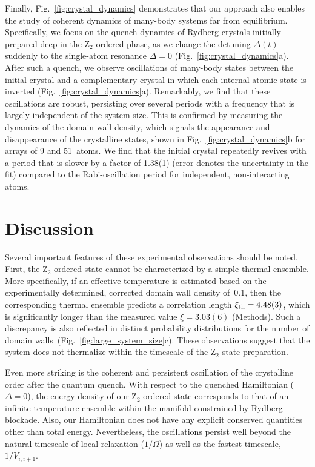 \documentclass[prl,nobalancelastpage,twocolumn,superscriptaddress,nofootinbib]{revtex4}
\begin{document}
Finally, Fig.~\ref{fig:crystal_dynamics} demonstrates that our approach  also
enables the study of coherent dynamics of many-body systems far from
equilibrium. Specifically, we focus on the quench dynamics of Rydberg crystals
initially prepared deep in the Z$_2$ ordered phase, as we change the
detuning $\Delta(t)$ suddenly to the single-atom resonance $\Delta =0$
(Fig.~\ref{fig:crystal_dynamics}a).  After such a quench, we observe
oscillations of many-body states between the initial crystal and a
complementary crystal in which each internal atomic state is inverted
(Fig.~\ref{fig:crystal_dynamics}a). Remarkably, we find that these oscillations are
robust, persisting over several periods with a frequency that is
largely independent of the system size. This is confirmed by measuring the
dynamics of the domain wall density, which signals the appearance and disappearance
of the crystalline states, shown in Fig.~\ref{fig:crystal_dynamics}b for arrays
of 9 and 51~atoms. We find that the initial crystal repeatedly revives with a
period that is slower by a factor of 1.38(1) (error denotes the uncertainty in the fit)
compared to the Rabi-oscillation period for independent, non-interacting atoms. 

\section{Discussion} 

Several important features of these experimental observations should be noted.
First, the Z$_2$ ordered state cannot be characterized by a simple
thermal ensemble. More specifically, if an effective temperature is estimated
based on the experimentally determined, corrected domain wall density of~0.1,
then the corresponding thermal ensemble predicts a correlation length $\xi_{\rm th}
= 4.48(3)$, which is significantly longer than the measured value $\xi=
3.03(6)$ (Methods). Such a discrepancy is also reflected in distinct
probability distributions for the number of domain
walls~(Fig.~\ref{fig:large_system_size}c).  These observations suggest that the
system does not thermalize within the timescale of the Z$_2$ state preparation.

Even more striking is the coherent and persistent oscillation of the
crystalline order after the quantum quench. With respect to the quenched
Hamiltonian ($\Delta = 0$), the energy density of our Z$_2$ ordered state
corresponds to that of an infinite-temperature ensemble within the manifold
constrained by Rydberg blockade. Also, our Hamiltonian does not have any
explicit conserved quantities other than total energy. Nevertheless, the
oscillations persist well beyond the natural timescale of local relaxation
($1/\Omega$) as well as the fastest timescale, $1/V_{i,i+1}$.
\end{document}
